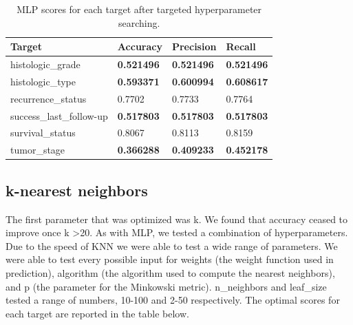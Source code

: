 \documentclass{article}
\begin{document}
\medskip
\begin{table}[H]
\begin{center}
\begin{tabular}{ *{4}{l} }
    \multicolumn{1}{p{1.5cm}}{\raggedright Target} &  
    \multicolumn{1}{p{1.5cm}}{\raggedright Accuracy} &  
    \multicolumn{1}{p{1.5cm}}{\raggedright Precision} &  
    \multicolumn{1}{p{1.5cm}}{\raggedright Recall} \\ \hline
histologic\_grade       &       \textbf{0.521496} &        \textbf{0.521496} &     \textbf{0.521496} \\
histologic\_type        &       \textbf{0.593371} &        \textbf{0.600994} &     \textbf{0.608617} \\
recurrence\_status      &         0.7702 &          0.7733 &       0.7764 \\
success\_last\_follow-up &       \textbf{0.517803} &        \textbf{0.517803} &     \textbf{0.517803} \\
survival\_status        &         0.8067 &          0.8113 &       0.8159 \\
tumor\_stage            &       \textbf{0.366288} &        \textbf{0.409233} &     \textbf{0.452178} \\
\end{tabular}
\caption{MLP scores for each target after targeted hyperparameter searching.}
\end{center}
\end{table}

\subsection{k-nearest neighbors}

The first parameter that was optimized was k. We found that accuracy ceased to improve once k \textgreater  20. 
As with MLP, we tested a combination of hyperparameters. 
Due to the speed of KNN we were able to test a wide range of parameters. We were able to test every possible input for weights (the weight function used in prediction), algorithm (the algorithm used to compute the nearest neighbors), and p (the parameter for the Minkowski metric). 
n\_neighbors and leaf\_size tested a range of numbers, 10-100 and 2-50 respectively.
The optimal scores for each target are reported in the table below.
\end{document}
